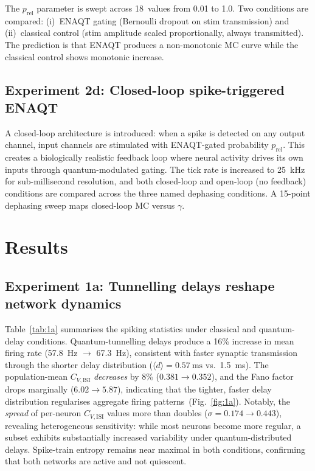 \documentclass[twocolumn,11pt]{article}
\newcommand{\CVISI}{C_{\!V,\mathrm{ISI}}}
\begin{document}
The $p_{\mathrm{rel}}$ parameter is swept across 18~values from
0.01 to 1.0.  Two conditions are compared:
(i)~ENAQT gating (Bernoulli dropout on stim transmission) and
(ii)~classical control (stim amplitude scaled proportionally,
always transmitted).  The prediction is that ENAQT produces a
non-monotonic MC curve while the classical control shows
monotonic increase.

\subsection{Experiment 2d: Closed-loop spike-triggered ENAQT}
\label{sec:meth-2d}

A closed-loop architecture is introduced: when a spike is
detected on any output channel, input channels are stimulated
with ENAQT-gated probability $p_{\mathrm{rel}}$.  This creates
a biologically realistic feedback loop where neural activity
drives its own inputs through quantum-modulated gating.  The
tick rate is increased to \SI{25}{\kilo\hertz} for
sub-millisecond resolution, and both closed-loop and open-loop
(no feedback) conditions are compared across the three named
dephasing conditions.  A 15-point dephasing sweep maps
closed-loop MC versus $\gamma$.

\section{Results}
\label{sec:results}

\subsection{Experiment 1a: Tunnelling delays reshape network
  dynamics}

Table~\ref{tab:1a} summarises the spiking statistics under
classical and quantum-delay conditions.
Quantum-tunnelling delays produce a 16\% increase in mean firing
rate (\SI{57.8}{\hertz} $\to$ \SI{67.3}{\hertz}), consistent
with faster synaptic transmission through the shorter delay
distribution ($\langle d \rangle = \SI{0.57}{\milli\second}$
vs.\ \SI{1.5}{\milli\second}).
The population-mean $\CVISI$ \emph{decreases} by 8\%
($0.381 \to 0.352$), and the Fano factor drops marginally
($6.02 \to 5.87$), indicating that the tighter, faster delay
distribution regularises aggregate firing
patterns~(Fig.~\ref{fig:1a}).
Notably, the \emph{spread} of per-neuron $\CVISI$ values
more than doubles ($\sigma = 0.174 \to 0.443$), revealing
heterogeneous sensitivity: while most neurons become more
regular, a subset exhibits substantially increased variability
under quantum-distributed delays.
Spike-train entropy remains near maximal in both conditions,
confirming that both networks are active and not quiescent.
\end{document}
